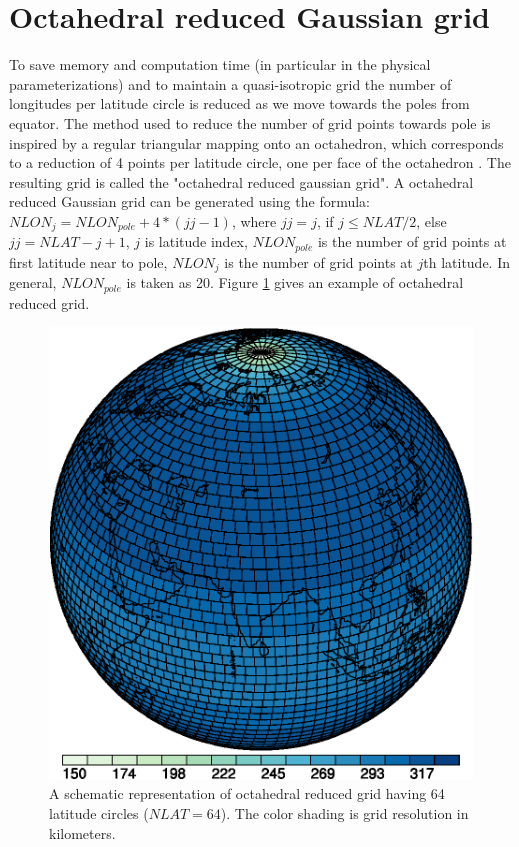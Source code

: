 \documentclass{SBCbookchapter}
\begin{document}
\section{Octahedral reduced Gaussian grid}
To save memory and computation time (in particular in the physical parameterizations) and to maintain a quasi-isotropic grid the number of longitudes per latitude circle is reduced as we move towards the poles from equator. 
The method used to reduce the number of grid points towards pole is inspired by a regular triangular mapping onto an octahedron, which corresponds to a reduction of 4 points per latitude circle, one per face of the octahedron \cite{malardel_new_2016}. The resulting grid is called the "octahedral reduced gaussian grid". A octahedral reduced Gaussian grid can be generated using the formula: $NLON_j = NLON_{pole} + 4*(jj-1)$, where $jj=j$, if $j \leq NLAT/2$, else $jj=NLAT-j+1$, $j$ is latitude index, $NLON_{pole}$ is the number of grid points at first latitude near to pole, $NLON_j$ is the number of grid points at $j$th latitude. In general, $NLON_{pole}$ is taken as 20. Figure \ref{fig1} gives an example of octahedral reduced grid.

\begin{figure}[H]
	\includegraphics[width=\linewidth]{red_sphere.eps}
	\caption{A schematic representation of octahedral reduced grid having 64 latitude circles ($NLAT=64$). The color shading is grid resolution in kilometers.}
	\label{fig1}
\end{figure}
\end{document}

